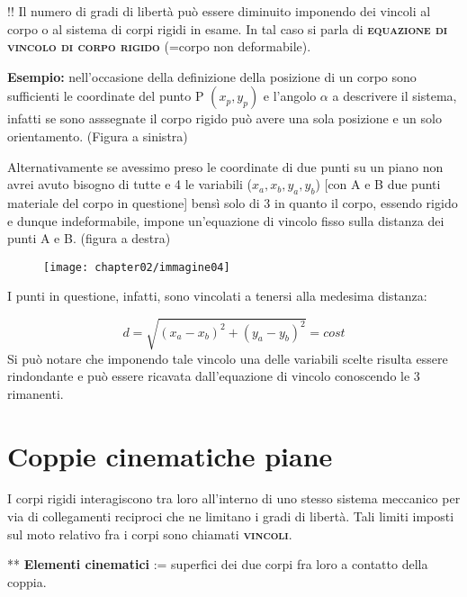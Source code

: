 		\vspace{0.5cm}
		!! Il numero di gradi di libertà può essere diminuito imponendo dei vincoli al corpo o al sistema di corpi rigidi in esame.
		In tal caso si parla di {\scshape{\bfseries equazione di vincolo di corpo rigido }}(=corpo non deformabile). \newline

		\textbf{Esempio:} nell'occasione della definizione della posizione di un corpo sono sufficienti le coordinate del punto P $(x_p, y_p)$  e l'angolo $\alpha$ a descrivere il sistema, infatti se sono asssegnate il corpo rigido può avere una sola posizione e un solo orientamento. (Figura a sinistra)

		Alternativamente se avessimo preso le coordinate di due punti su un piano non avrei avuto bisogno di tutte e 4 le variabili ($x_a, x_b, y_a, y_b$) [con A e B due punti materiale del corpo in questione]
		bensì solo di 3 in quanto il corpo, essendo rigido e dunque indeformabile, impone un'equazione di vincolo fisso sulla distanza dei punti A e B. (figura a destra)

			\begin{figure}[h]
				\centering
				\texttt{[image: chapter02/immagine04]}
			\end{figure}
			\begin{center}
				I punti in questione, infatti, sono vincolati a tenersi alla medesima distanza:
			\end{center}
			\begin{equation*}
				d = \sqrt{(x_a - x_b)^2 + (y_a - y_b)^2} = cost
			\end{equation*}
			Si può notare che imponendo tale vincolo una delle variabili scelte risulta essere rindondante e può essere ricavata dall'equazione di vincolo conoscendo le 3 rimanenti.

	\section{Coppie cinematiche piane}

		I corpi rigidi interagiscono tra loro all'interno di uno stesso sistema meccanico per via di collegamenti reciproci che ne limitano i gradi di libertà.
		Tali limiti imposti sul moto relativo fra i corpi sono chiamati {\scshape{\bfseries vincoli}}.\newline

			** \textbf{Elementi cinematici} := superfici dei due corpi fra loro a contatto della coppia.

